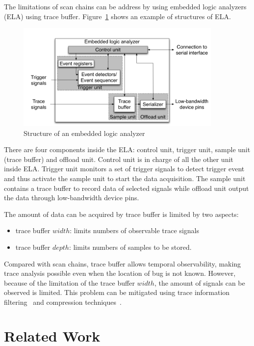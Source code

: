 \documentclass[12pt,frontmatter,copyright,thesis]{usfmanus}
\begin{document}
The limitations of scan chains can be address by using embedded logic analyzers (ELA)
using trace buffer. Figure~\ref{tb} shows an example of structures
of ELA.
\begin{figure}[h]
\centering
\includegraphics[width=0.9\textwidth]{tracebuffer.png}
\caption{Structure of an embedded logic analyzer~\cite{nicolici2009design}}
\label{tb}
\end{figure}
There are four components inside the ELA: control unit,
trigger unit, sample unit (trace buffer) and offload unit.
Control unit is in charge of all the other unit inside ELA.
Trigger unit monitors a set of trigger signals to detect
trigger event and thus activate the sample unit to
start the data acquisition. The sample unit contains a trace
buffer to record data of selected signals while
offload unit output the data through low-bandwidth device pins.

The amount of data can be acquired by trace buffer is limited by two aspects:
\begin{itemize}
\item
trace buffer $width$: limits numbers of observable trace signals
\item
trace buffer $depth$: limits numbers of samples to be stored.
\end{itemize}
Compared with scan chains, trace buffer allows temporal observability,
making trace analysis possible even when the location of bug
is not known. However, because of the limitation of the trace buffer $width$,
the amount of signals can be observed is limited. This problem can be
mitigated using trace information filtering~\cite{abramovici2006reconfigurable} and compression techniques~\cite{anis2007interactive}.



\section{Related Work}
\end{document}
